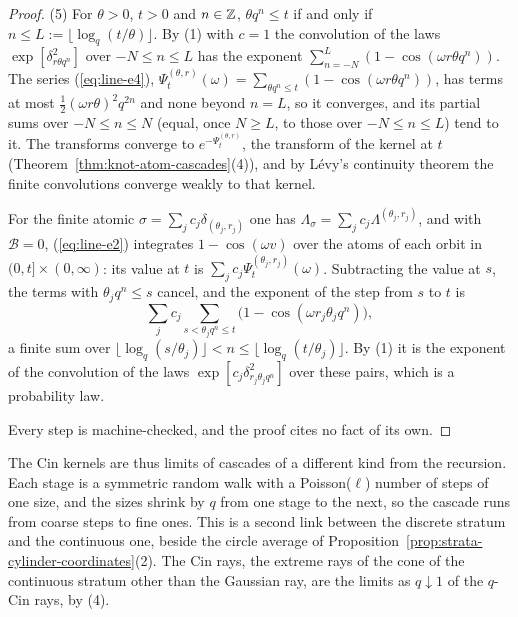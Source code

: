 \begin{proof}
(5) For $\theta > 0$, $t > 0$ and $n \in \mathbb{Z}$, $\theta q^n \le t$ if and only if
$n \le L := \lfloor\log_q(t/\theta)\rfloor$. By (1) with $c = 1$ the convolution of the laws
$\exp[\delta^2_{r\theta q^n}]$ over $-N \le n \le L$ has the exponent
$\sum_{n=-N}^{L}(1 - \cos(\omega r\theta q^n))$. The series (\ref{eq:line-e4}),
$\Psi^{(\theta,r)}_t(\omega) = \sum_{\theta q^n \le t}(1 - \cos(\omega r\theta q^n))$, has terms at most
$\tfrac12(\omega r\theta)^2q^{2n}$ and none beyond $n = L$, so it converges, and its partial sums over
$-N \le n \le N$ (equal, once $N \ge L$, to those over $-N \le n \le L$) tend to it. The transforms
converge to $e^{-\Psi^{(\theta,r)}_t}$, the transform of the kernel at $t$
(Theorem~\ref{thm:knot-atom-cascades}(4)), and by Lévy's continuity theorem the finite convolutions
converge weakly to that kernel.

For the finite atomic $\sigma = \sum_jc_j\delta_{(\theta_j,r_j)}$ one has
$\Lambda_\sigma = \sum_jc_j\Lambda^{(\theta_j,r_j)}$, and with $\mathcal{B} = 0$, (\ref{eq:line-e2}) integrates
$1 - \cos(\omega v)$ over the atoms of each orbit in $(0,t] \times (0,\infty)$: its value at $t$ is
$\sum_jc_j\Psi^{(\theta_j,r_j)}_t(\omega)$. Subtracting the value at $s$, the terms with
$\theta_jq^n \le s$ cancel, and the exponent of the step from $s$ to $t$ is
\[
  \sum_jc_j\sum_{s < \theta_jq^n \le t}\bigl(1 - \cos(\omega r_j\theta_jq^n)\bigr),
\]
a finite sum over $\lfloor\log_q(s/\theta_j)\rfloor < n \le \lfloor\log_q(t/\theta_j)\rfloor$. By (1)
it is the exponent of the convolution of the laws $\exp[c_j\delta^2_{r_j\theta_jq^n}]$ over these
pairs, which is a probability law.

Every step is machine-checked, and the proof cites no fact of its own.
\end{proof}

The Cin kernels are thus limits of cascades of a different kind from the \Matern{} recursion. Each
stage is a symmetric random walk with a Poisson($\ell$) number of steps of one size, and the sizes
shrink by $q$ from one stage to the next, so the cascade runs from coarse steps to fine ones. This is
a second link between the discrete stratum and the continuous one, beside the circle average of
Proposition~\ref{prop:strata-cylinder-coordinates}(2). The Cin rays, the extreme rays of the cone
of the continuous stratum other than the Gaussian ray, are the limits as $q \downarrow 1$ of the
$q$-Cin rays, by (4).
